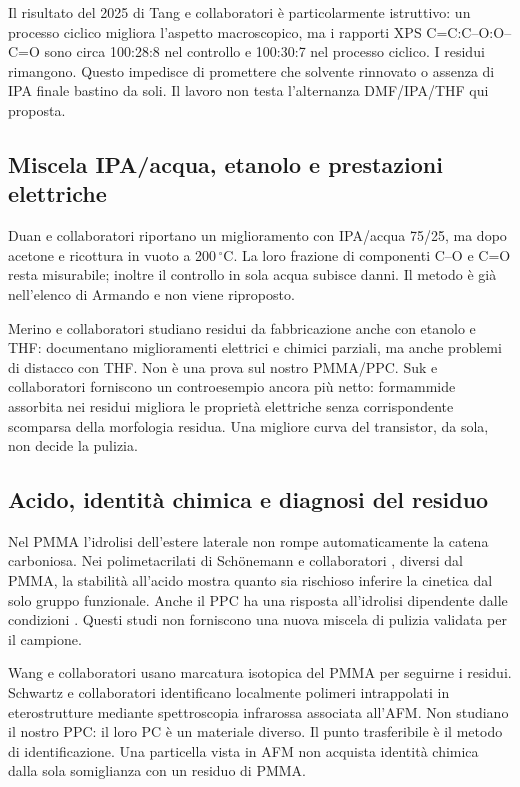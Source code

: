\documentclass[11pt,reqno]{amsart}
\numberwithin{equation}{section}
\newcommand{\degC}{\ensuremath{^{\circ}\mathrm{C}}}
\begin{document}
Il risultato del 2025 di Tang e collaboratori \cite{Tang2025}
\`e particolarmente istruttivo: un processo ciclico migliora
l'aspetto macroscopico, ma i rapporti XPS
C=C:C--O:O--C=O sono circa 100:28:8 nel controllo e 100:30:7
nel processo ciclico. I residui rimangono. Questo impedisce di
promettere che solvente rinnovato o assenza di IPA finale bastino
da soli. Il lavoro non testa l'alternanza DMF/IPA/THF qui proposta.

\subsection{Miscela IPA/acqua, etanolo e prestazioni elettriche}
Duan e collaboratori \cite{Duan2022} riportano un miglioramento
con IPA/acqua 75/25, ma dopo acetone e ricottura in vuoto a
200\,\degC. La loro frazione di componenti C--O e C=O resta
misurabile; inoltre il controllo in sola acqua subisce danni.
Il metodo \`e gi\`a nell'elenco di Armando e non viene riproposto.

Merino e collaboratori \cite{Merino2024} studiano residui da
fabbricazione anche con etanolo e THF: documentano miglioramenti
elettrici e chimici parziali, ma anche problemi di distacco con
THF. Non \`e una prova sul nostro PMMA/PPC. Suk e collaboratori
\cite{Suk2013} forniscono un controesempio ancora pi\`u netto:
formammide assorbita nei residui migliora le propriet\`a elettriche
senza corrispondente scomparsa della morfologia residua.
Una migliore curva del transistor, da sola, non decide la pulizia.

\subsection{Acido, identit\`a chimica e diagnosi del residuo}
Nel PMMA l'idrolisi dell'estere laterale non rompe automaticamente
la catena carboniosa. Nei polimetacrilati di Sch\"onemann e
collaboratori \cite{Schoenemann2018}, diversi dal PMMA, la stabilit\`a
all'acido mostra quanto sia rischioso inferire la cinetica dal solo
gruppo funzionale. Anche il PPC ha una risposta all'idrolisi
dipendente dalle condizioni \cite{Jung2006}. Questi studi non
forniscono una nuova miscela di pulizia validata per il campione.

Wang e collaboratori \cite{Wang2017} usano marcatura isotopica del
PMMA per seguirne i residui. Schwartz e collaboratori
\cite{Schwartz2019} identificano localmente polimeri intrappolati
in eterostrutture mediante spettroscopia infrarossa associata
all'AFM. Non studiano il nostro PPC: il loro PC \`e un materiale
diverso. Il punto trasferibile \`e il metodo di identificazione.
Una particella vista in AFM non acquista identit\`a chimica dalla
sola somiglianza con un residuo di PMMA.
\end{document}
